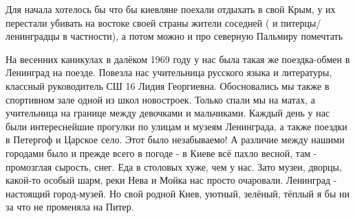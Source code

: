 \begin{itemize}
\begin{itemize}
\end{itemize} %


Для начала хотелось бы что бы киевляне поехали отдыхать в свой Крым, у их
перестали убивать на востоке своей страны жители соседней ( и
питерцы/ленинградцы в частности), а потом можно и про северную Пальмиру
помечтать


На весенних каникулах в далёком 1969 году у нас была такая же поездка-обмен в
Ленинград на поезде. Повезла нас учительница русского языка и литературы,
классный руководитель СШ 16 Лидия Георгиевна. Обосновались мы также в
спортивном зале одной из школ новостроек. Только спали мы на матах, а
учительница на границе между девочками и мальчиками. Каждый день у нас были
интереснейшие прогулки по улицам и музеям Ленинграда, а также поездки в
Петергоф и Царское село. Этот было незабываемо! А различие между нашими
городами было и прежде всего в погоде - в Киеве всё пахло весной, там -
промозглая сырость, снег. Еда в столовых хуже, чем у нас. Зато музеи, дворцы,
какой-то особый шарм, реки Нева и Мойка нас просто очаровали. Ленинград -
настоящий город-музей. Но свой родной Киев, уютный, зелёный, тёплый я бы ни за
что не променяла на Питер.

\end{itemize} %
